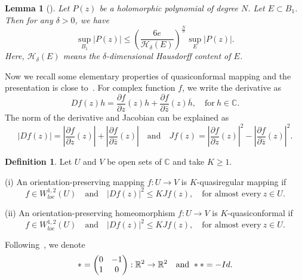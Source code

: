 \documentclass[a4paper,reqno]{amsart}
\newtheorem{lemma}[theorem]{Lemma}
\theoremstyle{definition}
\newtheorem{definition}[theorem]{Definition}
\numberwithin{equation}{section}
\newcommand{\R}{\mathbb{R}}
\def \R {{\mathbb{R} }}
\begin{document}
\begin{lemma}[\cite{FY}]\label{le:poly}
Let $P(z)$ be a holomorphic polynomial of degree $N$. Let $E\subset B_{1}$. Then for any $\delta>0$, we have 
\begin{equation*}
    \sup_{B_{1}}\left|P(z)\right|\le \left(\frac{6e}{\mathcal{H}_{\delta}(E)}\right)^{\frac{N}{\delta}}\sup_{E}\left|P(z)\right|.
\end{equation*}
    Here, $\mathcal{H}_{\delta}(E)$ means the $\delta$-dimensional Hausdorff content of $E$.
\end{lemma}
    
Now we recall some elementary properties of quasiconformal mapping and the presentation is close to~\cite{AIM}. For complex function $f$, we write the derivative as 
\begin{equation*}
    Df(z)h=\frac{\partial f}{\partial z}(z)h+\frac{\partial f}{\partial \bar{z}}(z)\overline{h},\quad \mbox{for}\ h\in \mathbb{C}.
\end{equation*}
The norm of the derivative and Jacobian can be explained as 
\begin{equation*}
    |Df(z)|=\left|\frac{\partial f}{\partial z}(z)\right|+\left|\frac{\partial f}{\partial \bar{z}}(z)\right|\quad \mbox{and}\quad 
    Jf(z)=\left|\frac{\partial f}{\partial z}(z)\right|^{2}-\left|\frac{\partial f}{\partial \bar{z}}(z)\right|^{2}.
    \end{equation*}

\begin{definition}
    Let $U$ and $V$ be open sets of $\mathbb{C}$ and take $K\ge 1$.

(i) An orientation-preserving mapping $f:U\to V$ is $K$-quasiregular mapping if 
    \begin{equation*}
    f\in W_{loc}^{1,2}(U)\quad \mbox{and}\quad 
    \left|Df(z)\right|^{2}\le K Jf(z),\quad \mbox{for almost every}\ z\in U.
    \end{equation*}    
    
    (ii) An orientation-preserving homeomorphism $f:U\to V$ is $K$-quasiconformal if 
    \begin{equation*}
    f\in W_{loc}^{1,2}(U)\quad \mbox{and}\quad 
    \left|Df(z)\right|^{2}\le K Jf(z),\quad \mbox{for almost every}\ z\in U.
    \end{equation*}
    
    \end{definition}

Following~\cite[Chapter 16]{AIM}, we denote 
\begin{equation*}
    *=\begin{pmatrix}
        0 &-1\\
        1 &0
    \end{pmatrix}:\R^{2}\to \R^{2}\quad \mbox{and}\ **=-{\rm{Id}}.
    \end{equation*}
\end{document}

